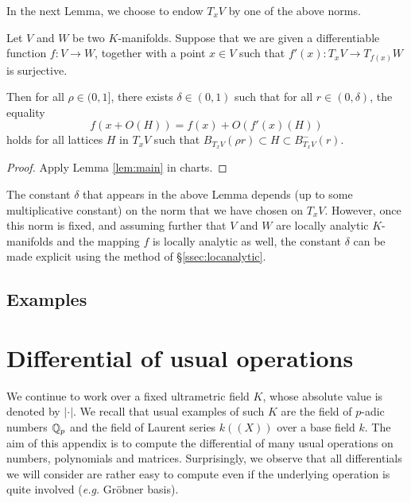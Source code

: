 \documentclass{lms}
\begin{document}
In the next Lemma, we choose to endow $T_x V$ by one of the above norms.

\begin{lem}
Let $V$ and $W$ be two $K$-manifolds. 
Suppose that we are given a differentiable function $f : V \to W$, 
together with a point $x \in V$ such that $f'(x) : T_x V \to T_{f(x)} W$ 
is surjective. 

Then for all $\rho \in (0,1]$, there exists $\delta \in (0,1)$ such 
that for all $r \in (0, \delta)$, the equality
$$f(x + O(H)) = f(x) + O(f'(x)(H))$$
holds for all lattices $H$ in $T_x V$ such that $B^{\phantom -}_{T_x V}(\rho r)
\subset H \subset B^-_{T_x V}(r)$.
\end{lem}

\begin{proof}
Apply Lemma \ref{lem:main} in charts.
\end{proof}

\begin{rmk}
The constant $\delta$ that appears in the above Lemma depends (up to
some multiplicative constant) on the norm that we have chosen on $T_x V$. 
However, once this norm is fixed, and assuming further that $V$ and $W$ 
are locally analytic $K$-manifolds and the mapping $f$ is locally 
analytic as well, the constant $\delta$ can be made explicit using the 
method of \S \ref{ssec:locanalytic}.
\end{rmk}

\subsection{Examples}


\section{Differential of usual operations}
\label{ssec:differentials}

We continue to work over a fixed ultrametric field $K$, whose absolute 
value is denoted by $|\cdot|$. We recall that usual examples of such $K$ 
are the field of $p$-adic numbers $\mathbb Q_p$ and the field of Laurent series 
$k((X))$ over a base field $k$. The aim of this appendix is to compute 
the differential of many usual operations on numbers, polynomials and 
matrices. Surprisingly, we observe that all differentials we will 
consider are rather easy to compute even if the underlying operation is 
quite involved (\emph{e.g.} Gr\"obner basis).
\end{document}

